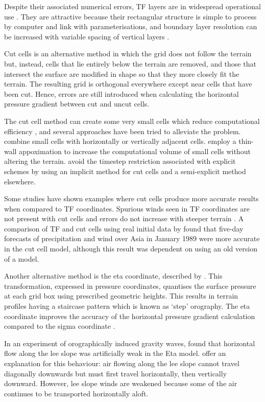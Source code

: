 \documentclass{ametsoc}
\begin{document}
Despite their associated numerical errors, TF layers are in widespread operational use \citep{steppeler2003}.  They are attractive because their rectangular structure is simple to process by computer and link with parameterisations, and boundary layer resolution can be increased with variable spacing of vertical layers \citep{schaer2002}.

Cut cells is an alternative method in which the grid does not follow the terrain but, instead, cells that lie entirely below the terrain are removed, and those that intersect the surface are modified in shape so that they more closely fit the terrain.  The resulting grid is orthogonal everywhere except near cells that have been cut.  Hence, errors are still introduced when calculating the horizontal pressure gradient between cut and uncut cells.

The cut cell method can create some very small cells which reduce computational efficiency \citep{klein2009}, and several approaches have been tried to alleviate the problem.  \citet{yamazaki-satomura2010} combine small cells with horizontally or vertically adjacent cells.  \citet{steppeler2002} employ a thin-wall appoximation to increase the computational volume of small cells without altering the terrain.  \citet{jebens2011} avoid the timestep restriction associated with explicit schemes by using an implicit method for cut cells and a semi-explicit method elsewhere.

Some studies have shown examples where cut cells produce more accurate results when compared to TF coordinates.  Spurious winds seen in TF coordinates are not present with cut cells and errors do not increase with steeper terrain \citep{good2014}.  A comparison of TF and cut cells using real initial data by \citet{steppeler2013} found that five-day forecasts of precipitation and wind over Asia in January 1989 were more accurate in the cut cell model, although this result was dependent on using an old version of a model.

Another alternative method is the eta coordinate, described by \citet{mesinger1988}.  This transformation, expressed in pressure coordinates, quantises the surface pressure at each grid box using prescribed geometric heights.  This results in terrain profiles having a staircase pattern which is known as `step' orography.  The eta coordinate improves the accuracy of the horizontal pressure gradient calculation compared to the sigma coordinate \citep{mesinger1988}.

In an experiment of orographically induced gravity waves, \citet{gallus-klemp2000} found that horizontal flow along the lee slope was artificially weak in the Eta model.  \citet{mesinger2012} offer an explanation for this behaviour: air flowing along the lee slope cannot travel diagonally downwards but must first travel horizontally, then vertically downward.  However, lee slope winds are weakened because some of the air continues to be transported horizontally aloft.
\end{document}

